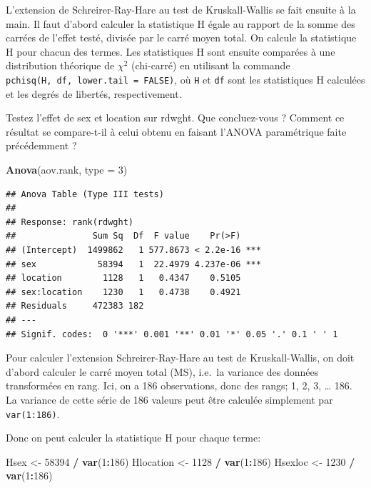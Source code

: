 \documentclass[12pt,]{book}
\newenvironment{Shaded}{\begin{snugshade}}{\end{snugshade}}
\newcommand{\DataTypeTok}[1]{\textcolor[rgb]{0.13,0.29,0.53}{#1}}
\newcommand{\DecValTok}[1]{\textcolor[rgb]{0.00,0.00,0.81}{#1}}
\newcommand{\KeywordTok}[1]{\textcolor[rgb]{0.13,0.29,0.53}{\textbf{#1}}}
\newcommand{\NormalTok}[1]{#1}
\newcommand{\OperatorTok}[1]{\textcolor[rgb]{0.81,0.36,0.00}{\textbf{#1}}}
\newcommand{\StringTok}[1]{\textcolor[rgb]{0.31,0.60,0.02}{#1}}
\begin{document}
L'extension de Schreirer-Ray-Hare au test de Kruskall-Wallis se fait ensuite à la main. Il faut d'abord calculer la statistique H égale au rapport de la somme des carrées de l'effet testé, divisée par le carré moyen total. On calcule la statistique H pour chacun des termes. Les statistiques H sont ensuite comparées à une distribution théorique de \(\chi^2\) (chi-carré) en utilisant la commande \texttt{pchisq(H,\ df,\ lower.tail\ =\ FALSE)}, où \texttt{H} et \texttt{df} sont les statistiques H calculées et les degrés de libertés, respectivement.

Testez l'effet de sex et location sur rdwght. Que concluez-vous ? Comment ce résultat se compare-t-il à celui obtenu en faisant l'ANOVA paramétrique faite précédemment ?

\begin{Shaded}
\begin{Highlighting}[]
\KeywordTok{Anova}\NormalTok{(aov.rank, }\DataTypeTok{type =} \DecValTok{3}\NormalTok{)}
\end{Highlighting}
\end{Shaded}

\begin{verbatim}
## Anova Table (Type III tests)
## 
## Response: rank(rdwght)
##               Sum Sq  Df  F value    Pr(>F)    
## (Intercept)  1499862   1 577.8673 < 2.2e-16 ***
## sex            58394   1  22.4979 4.237e-06 ***
## location        1128   1   0.4347    0.5105    
## sex:location    1230   1   0.4738    0.4921    
## Residuals     472383 182                       
## ---
## Signif. codes:  0 '***' 0.001 '**' 0.01 '*' 0.05 '.' 0.1 ' ' 1
\end{verbatim}

Pour calculer l'extension Schreirer-Ray-Hare au test de Kruskall-Wallis, on doit d'abord calculer le carré moyen total (MS), i.e.~la variance des données transformées en rang. Ici, on a 186 observations, donc des rangs; 1, 2, 3, \ldots{} 186. La variance de cette série de 186 valeurs peut être calculée simplement par \texttt{var(1:186)}.

Donc on peut calculer la statistique H pour chaque terme:

\begin{Shaded}
\begin{Highlighting}[]
\NormalTok{Hsex <-}\StringTok{ }\DecValTok{58394} \OperatorTok{/}\StringTok{ }\KeywordTok{var}\NormalTok{(}\DecValTok{1}\OperatorTok{:}\DecValTok{186}\NormalTok{)}
\NormalTok{Hlocation <-}\StringTok{ }\DecValTok{1128} \OperatorTok{/}\StringTok{ }\KeywordTok{var}\NormalTok{(}\DecValTok{1}\OperatorTok{:}\DecValTok{186}\NormalTok{)}
\NormalTok{Hsexloc <-}\StringTok{ }\DecValTok{1230} \OperatorTok{/}\StringTok{ }\KeywordTok{var}\NormalTok{(}\DecValTok{1}\OperatorTok{:}\DecValTok{186}\NormalTok{)}
\end{Highlighting}
\end{Shaded}
\end{document}
